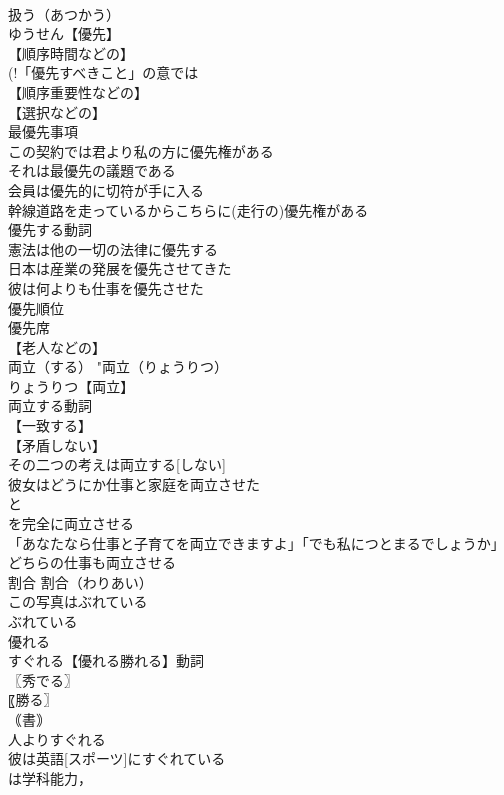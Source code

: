 \documentclass[8pt]{extreport}
\begin{document}
\begin{CJK}{UTF8}{min}
\\	扱う（あつかう）
\\	ゆうせん【優先】
\\	【順序時間などの】
\\	(!「優先すべきこと」の意では 
\\	【順序重要性などの】
\\	【選択などの】
\\	最優先事項
\\	この契約では君より私の方に優先権がある
\\	それは最優先の議題である
\\	会員は優先的に切符が手に入る
\\	幹線道路を走っているからこちらに(走行の)優先権がある
\\	優先する動詞
\\	憲法は他の一切の法律に優先する
\\	日本は産業の発展を優先させてきた
\\	彼は何よりも仕事を優先させた
\\	優先順位
\\	優先席
\\	【老人などの】
\\	両立（する）		"両立（りょうりつ）
\\	りょうりつ【両立】
\\	両立する動詞
\\	【一致する】
\\	【矛盾しない】
\\	その二つの考えは両立する[しない]
\\	彼女はどうにか仕事と家庭を両立させた
\\	と
\\	を完全に両立させる
\\	「あなたなら仕事と子育てを両立できますよ」「でも私につとまるでしょうか」
\\	どちらの仕事も両立させる
\\	割合		割合（わりあい）
\\	この写真はぶれている		
\\	ぶれている
\\	優れる		
\\	すぐれる【優れる勝れる】動詞
\\	〖秀でる〗
\\	〖勝る〗
\\	｟書｠ 
\\	人よりすぐれる
\\	彼は英語[スポーツ]にすぐれている
\\	は学科能力， 

\end{CJK}
\end{document}
